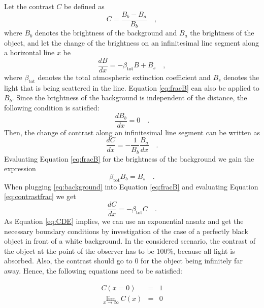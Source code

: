 Let the contrast $C$ be defined as 
\begin{equation}
    C=\frac{ B_{b} - B_{a} }{B_{b}} \quad ,
\end{equation}
where $B_{b}$ denotes the brightness of the background and $B_{a}$ the brightness of the object,
and let the change of the brightness on an infinitesimal line segment along a horizontal line $x$ be
\begin{equation}
    \frac{dB}{dx}=- \beta_{\mathrm{tot}}B + B_{s} \quad ,
    \label{eq:fracB}
\end{equation}
where $ \beta_{\mathrm{tot}}$ denotes the total atmospheric extinction coefficient and  $B_{s}$ denotes the light that is being scattered in the line. Equation \eqref{eq:fracB} can also be applied to $B_{b}$.
Since the brightness of the background is independent of the distance, the following condition is satisfied:
\begin{equation}
    \frac{dB_{b}}{dx}=0 \quad .
\end{equation}
Then, the change of contrast along an infinitesimal line segment can be written as
\begin{equation}
    \frac{d C }{dx} = -\frac{1}{B_{b}} \frac{B_{a}} {dx}  \quad .
    \label{eq:contrastfrac}
\end{equation}
Evaluating Equation \eqref{eq:fracB} for the brightness of the background we gain the expression
\begin{equation}
    \beta_{\mathrm{tot}}B_{b}= B_{s} \quad .
    \label{eq:background}
\end{equation}
When plugging \eqref{eq:background} into Equation \eqref{eq:fracB} and evaluating Equation \eqref{eq:contrastfrac} we get
\begin{equation}
    \frac{d C}{d x} = - \beta_{\mathrm{tot}} C
    \label{eq:CDE} \quad .
\end{equation}
As Equation \eqref{eq:CDE} implies, we can use an exponential ansatz and get the necessary boundary conditions by investigation of the case of a perfectly black object in front of a white background. In the considered scenario, the contrast of the object at the point of the observer has to be 100\%, because all light is absorbed. Also, the contrast should go to 0 for the object being infinitely far away. Hence, the following equations need to be satisfied:

\begin{eqnarray}
     C(x=0)&=&1\\
     \lim_{x \to \infty} C(x)&=&0 
\end{eqnarray}

